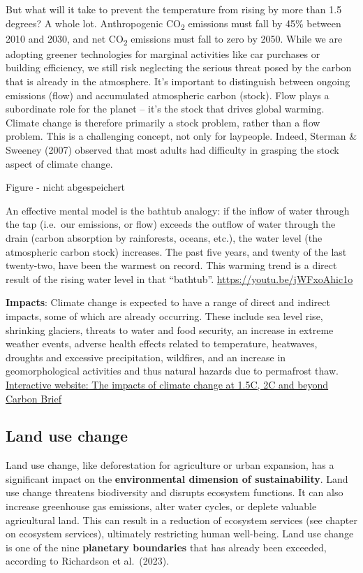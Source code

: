 \documentclass[
  a4paper,
  openany]{book}
\begin{document}
But what will it take to prevent the temperature from rising by more
than 1.5 degrees? A whole lot. Anthropogenic CO\textsubscript{2}
emissions must fall by 45\% between 2010 and 2030, and net
CO\textsubscript{2} emissions must fall to zero by 2050. While we are
adopting greener technologies for marginal activities like car purchases
or building efficiency, we still risk neglecting the serious threat
posed by the carbon that is already in the atmosphere. It's important to
distinguish between ongoing emissions (flow) and accumulated atmospheric
carbon (stock). Flow plays a subordinate role for the planet -- it's the
stock that drives global warming. Climate change is therefore primarily
a stock problem, rather than a flow problem. This is a challenging
concept, not only for laypeople. Indeed, Sterman \& Sweeney (2007)
observed that most adults had difficulty in grasping the stock aspect of
climate change.

Figure - nicht abgespeichert

An effective mental model is the bathtub analogy: if the inflow of water
through the tap (i.e.~our emissions, or flow) exceeds the outflow of
water through the drain (carbon absorption by rainforests, oceans,
etc.), the water level (the atmospheric carbon stock) increases. The
past five years, and twenty of the last twenty-two, have been the
warmest on record. This warming trend is a direct result of the rising
water level in that ``bathtub''. \url{https://youtu.be/jWFxoAhic1o}

\textbf{Impacts}: Climate change is expected to have a range of direct
and indirect impacts, some of which are already occurring. These include
sea level rise, shrinking glaciers, threats to water and food security,
an increase in extreme weather events, adverse health effects related to
temperature, heatwaves, droughts and excessive precipitation, wildfires,
and an increase in geomorphological activities and thus natural hazards
due to permafrost thaw.
\href{https://interactive.carbonbrief.org/impacts-climate-change-one-point-five-degrees-two-degrees/}{Interactive
website: The impacts of climate change at 1.5C, 2C and beyond \textbar{}
Carbon Brief}

\subsection{Land use change}\label{land-use-change}

Land use change, like deforestation for agriculture or urban expansion,
has a significant impact on the \textbf{environmental dimension of
sustainability}. Land use change threatens biodiversity and disrupts
ecosystem functions. It can also increase greenhouse gas emissions,
alter water cycles, or deplete valuable agricultural land. This can
result in a reduction of ecosystem services (see chapter on ecosystem
services), ultimately restricting human well-being. Land use change is
one of the nine \textbf{planetary boundaries} that has already been
exceeded, according to Richardson et al.~(2023).
\end{document}
